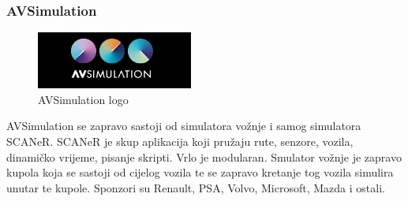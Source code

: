 \subsubsection{AVSimulation}
\begin{figure}[ht!]
  \centering
  \includegraphics{images/avsimulation_logo.png}
  \caption{AVSimulation logo\cite{logo:avsimulation}}
\end{figure}

AVSimulation se zapravo sastoji od simulatora vožnje i samog simulatora SCANeR. SCANeR je skup aplikacija koji pružaju rute, senzore, vozila, dinamičko vrijeme, pisanje skripti. Vrlo je modularan. Smulator vožnje je zapravo kupola koja se sastoji od cijelog vozila te se zapravo kretanje tog vozila simulira unutar te kupole. Sponzori su Renault, PSA, Volvo, Microsoft, Mazda i ostali.
\newpage